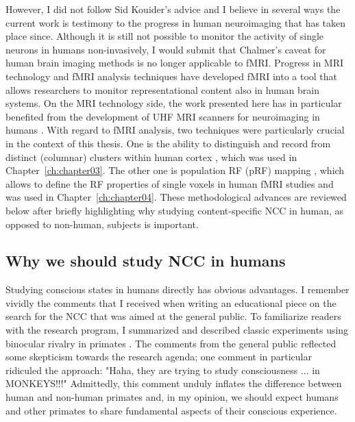 However, I did not follow Sid Kouider's advice and I believe in several ways the current work is testimony to the progress in human neuroimaging that has taken place since. Although it is still not possible to monitor the activity of single neurons in humans non-invasively, I would submit that Chalmer's caveat for human brain imaging methods is no longer applicable to fMRI. Progress in MRI technology \parencite{Vaughan2001, Duyn2011, Ugurbil2014} and fMRI analysis techniques \parencite{Wandell2015, DeMartino2016, Kashyap2017, Kemper2017, Polimeni2017} have developed fMRI into a tool that allows researchers to monitor representational content also in human brain systems. On the MRI technology side, the work presented here has in particular benefited from the development of UHF MRI scanners for neuroimaging in humans \parencite{Ugurbil2003}. With regard to fMRI analysis, two techniques were particularly crucial in the context of this thesis. One is the ability to distinguish and record from distinct (columnar) clusters within human cortex \parencite{Cheng2001, Yacoub2007, Yacoub2008}, which was used in Chapter~\ref{ch:chapter03}. The other one is population RF (pRF) mapping \parencite{Dumoulin2008}, which allows to define the RF properties of single voxels in human fMRI studies and was used in Chapter~\ref{ch:chapter04}. These methodological advances are reviewed below after briefly highlighting why studying content-specific NCC in human, as opposed to non-human, subjects is important.

\subsection{Why we should study NCC in humans}
Studying conscious states in humans directly has obvious advantages. I remember vividly the comments that I received when writing an educational piece on the search for the NCC that was aimed at the general public. To familiarize readers with the research program, I summarized and described classic experiments using binocular rivalry in primates \parencite{Logothetis1989, Sheinberg1997}. The comments from the general public reflected some skepticism towards the research agenda; one comment in particular ridiculed the approach: "Haha, they are trying to study consciousness ... in MONKEYS!!!" Admittedly, this comment unduly inflates the difference between human and non-human primates and, in my opinion, we should expect humans and other primates to share fundamental aspects of their conscious experience.


